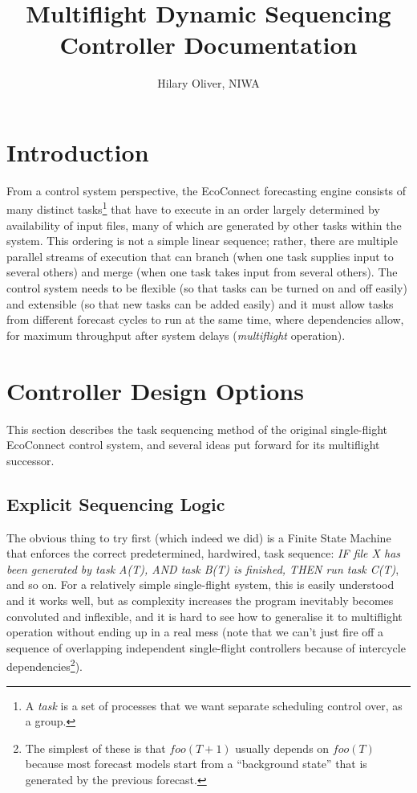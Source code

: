 \documentclass[a4paper,12pt]{amsart}
\title{Multiflight Dynamic Sequencing Controller Documentation}
\author{Hilary Oliver, NIWA}
\begin{document}
\maketitle

\section{Introduction} 

From a control system perspective, the EcoConnect forecasting engine
consists of many distinct tasks\footnote{A {\em task} is a set of
processes that we want separate scheduling control over, as a group.}
that have to execute in an order largely determined by availability of
input files, many of which are generated by other tasks within the
system. This ordering is not a simple linear sequence; rather, there are
multiple parallel streams of execution that can branch (when one task
supplies input to several others) and merge (when one task takes input
from several others). The control system needs to be flexible (so that
tasks can be turned on and off easily) and extensible (so that new tasks
can be added easily) and it must allow tasks from different forecast
cycles to run at the same time, where dependencies allow, for maximum
throughput after system delays ({\em multiflight} operation). 


\section{Controller Design Options}

This section describes the task sequencing method of the original
single-flight EcoConnect control system, and several ideas put forward
for its multiflight successor.

\subsection{Explicit Sequencing Logic}

The obvious thing to try first (which indeed we did) is a Finite State
Machine that enforces the correct predetermined, hardwired, task
sequence: {\em IF file X has been generated by task A(T), AND task B(T)
is finished, THEN run task C(T)}, and so on. For a relatively simple
single-flight system, this is easily understood and it works well, but
as complexity increases the program inevitably becomes convoluted and
inflexible, and it is hard to see how to generalise it to multiflight
operation without ending up in a real mess (note that we can't just fire
off a sequence of overlapping independent single-flight controllers
because of intercycle dependencies\footnote{The simplest of these is
that $foo(T+1)$ usually depends on $foo(T)$ because most forecast models
start from a ``background state'' that is generated by the previous
forecast.}). 
\end{document}
